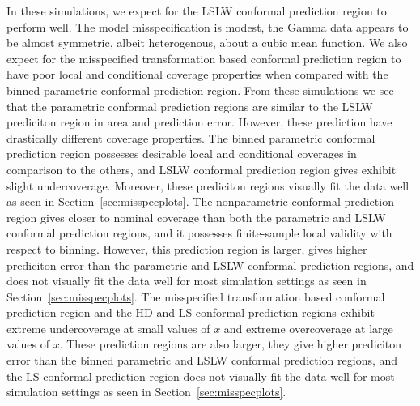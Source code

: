 \documentclass[11pt]{article}\usepackage[]{graphicx}\usepackage[]{color}
\begin{document}
In these simulations, we expect for the LSLW conformal prediction region to 
perform well.  The model misspecification is modest, the Gamma data  
appears to be almost symmetric, albeit heterogenous, about a cubic mean 
function.  
We also expect for the misspecified transformation based conformal 
prediction region to have poor local and conditional coverage properties 
when compared with the binned parametric conformal prediction region.
From these simulations we see that the parametric conformal 
prediction regions are similar to the LSLW prediciton region in area and 
prediction error.  However, these prediction have drastically different 
coverage properties.  The binned parametric conformal prediction region 
possesses desirable local and conditional coverages in comparison to the 
others, and LSLW conformal prediction region gives exhibit slight 
undercoverage.  Moreover, these prediciton regions visually 
fit the data well as seen in Section~\ref{sec:misspecplots}.
The nonparametric conformal prediction region gives closer to nominal 
coverage than both the parametric and LSLW conformal prediction regions, 
and it possesses finite-sample local validity with respect to 
binning.  However, this prediction region is larger, gives higher 
prediciton error than the parametric and LSLW conformal prediction 
regions, and does not visually fit the data well for most simulation settings 
as seen in Section~\ref{sec:misspecplots}.  The misspecified transformation 
based conformal prediction region and the HD and LS 
conformal prediction regions exhibit extreme undercoverage at small values 
of $x$ and extreme overcoverage at large values of $x$.  These prediction 
regions are also larger, they give higher prediciton error than the 
binned parametric and LSLW conformal prediction regions, and the LS 
conformal prediction region does not visually fit the data well for most 
simulation settings as seen in Section~\ref{sec:misspecplots}. 



\end{document}
